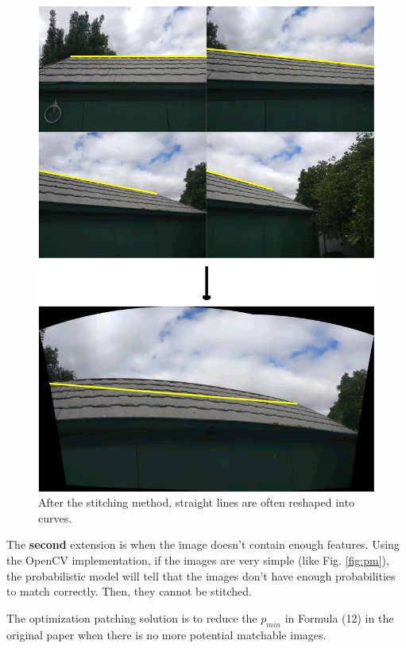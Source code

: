 \documentclass[10pt,twocolumn,letterpaper]{article}
\begin{document}
\begin{figure}[t]
    \begin{center}
        \includegraphics[width=0.9\linewidth]{line_combine}
    \end{center}
    \caption{After the stitching method, straight lines are often reshaped into curves.}
    \label{fig:cml}
\end{figure}

The \textbf{second} extension is when the image doesn't contain enough features.
Using the OpenCV implementation, if the images are very simple (like Fig. \ref{fig:pm}),
the probabilistic model will tell that the images don't have enough probabilities to match correctly.
Then, they cannot be stitched.

The optimization patching solution is to reduce the $p_{min}$ in Formula (12) in the original paper when there is no more potential matchable images.
\end{document}
